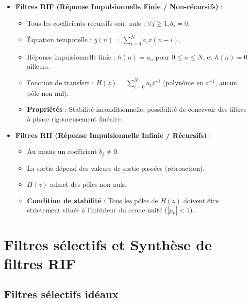 \begin{proposition}
    \begin{itemize}
        \item \textbf{Filtres RIF (Réponse Impulsionnelle Finie / Non-récursifs)} :
            \begin{itemize}
                \item Tous les coefficients récursifs sont nuls : $\forall j \geqslant 1, b_j = 0$.
                \item Équation temporelle : $y(n) = \sum_{i=0}^N a_i x(n-i)$.
                \item Réponse impulsionnelle finie : $h(n) = a_n$ pour $0 \leqslant n \leqslant N$, et $h(n) = 0$ ailleurs.
                \item Fonction de transfert : $H(z) = \sum_{i=0}^N a_i z^{-i}$ (polynôme en $z^{-1}$, aucun pôle non nul).
                \item \textbf{Propriétés} : Stabilité inconditionnelle, possibilité de concevoir des filtres à phase rigoureusement linéaire.
            \end{itemize}
        \item \textbf{Filtres RII (Réponse Impulsionnelle Infinie / Récursifs)} :
            \begin{itemize}
                \item Au moins un coefficient $b_j \neq 0$.
                \item La sortie dépend des valeurs de sortie passées (rétroaction).
                \item $H(z)$ admet des pôles non nuls.
                \item \textbf{Condition de stabilité} : Tous les pôles de $H(z)$ doivent être strictement situés à l'intérieur du cercle unité ($|p_k| < 1$).
            \end{itemize}
    \end{itemize}
\end{proposition}


\section{Filtres sélectifs et Synthèse de filtres RIF}

\subsection{Filtres sélectifs idéaux}

